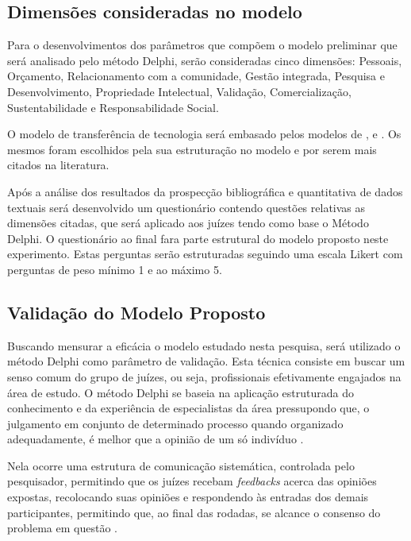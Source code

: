 \subsection{Dimensões consideradas no modelo}


Para o desenvolvimentos dos parâmetros que compõem o modelo preliminar que será analisado pelo método Delphi, serão consideradas cinco dimensões: Pessoais, Orçamento, Relacionamento com a comunidade, Gestão integrada, Pesquisa e Desenvolvimento, Propriedade Intelectual, Validação, Comercialização, Sustentabilidade e  Responsabilidade Social.


O modelo de transferência de tecnologia será embasado pelos modelos de ,  e . Os mesmos foram escolhidos pela sua estruturação no modelo e por serem mais citados na literatura.

Após a análise dos resultados da prospecção bibliográfica e  quantitativa de dados textuais será desenvolvido um questionário contendo questões relativas as dimensões citadas, que será aplicado aos juízes tendo como base o Método Delphi. O questionário ao final fara parte estrutural do modelo proposto neste experimento. Estas perguntas serão estruturadas seguindo uma escala Likert com perguntas de peso mínimo 1 e ao máximo 5. 


\subsection{Validação do Modelo Proposto}


Buscando mensurar a eficácia o modelo estudado nesta pesquisa, será utilizado o método Delphi como parâmetro de validação. Esta técnica consiste em buscar um senso comum do grupo de juízes, ou seja, profissionais efetivamente engajados na área de estudo. O método Delphi se baseia na aplicação estruturada do conhecimento e da experiência de especialistas da área pressupondo que, o julgamento em conjunto de determinado processo quando organizado adequadamente, é melhor que a opinião de um só indivíduo \cite{faro_tecnica_1997,santiago_matriz_2012}. 

Nela  ocorre uma estrutura de comunicação sistemática, controlada pelo pesquisador, permitindo que os juízes recebam \textit{feedbacks} acerca das opiniões expostas, recolocando suas opiniões e respondendo às entradas dos demais participantes, permitindo que, ao final das rodadas, se alcance o consenso do problema em questão \cite{massaroli_metodo_2017}. 

